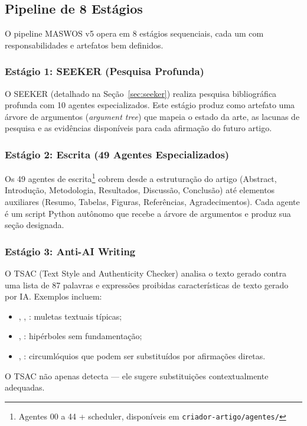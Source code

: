 \subsection{Pipeline de 8 Estágios}

O pipeline MASWOS v5 opera em 8 estágios sequenciais, cada um com
responsabilidades e artefatos bem definidos.

\subsubsection{Estágio 1: SEEKER (Pesquisa Profunda)}

O SEEKER (detalhado na Seção~\ref{sec:seeker}) realiza pesquisa
bibliográfica profunda com 10 agentes especializados. Este estágio
produz como artefato uma árvore de argumentos (\textit{argument
tree}) que mapeia o estado da arte, as lacunas de pesquisa e as
evidências disponíveis para cada afirmação do futuro artigo.

\subsubsection{Estágio 2: Escrita (49 Agentes Especializados)}

Os 49 agentes de escrita\footnote{Agentes 00 a 44 + scheduler,
disponíveis em \texttt{criador-artigo/agentes/}} cobrem desde a
estruturação do artigo (Abstract, Introdução, Metodologia,
Resultados, Discussão, Conclusão) até elementos auxiliares
(Resumo, Tabelas, Figuras, Referências, Agradecimentos). Cada
agente é um script Python autônomo que recebe a árvore de argumentos
e produz sua seção designada.

\subsubsection{Estágio 3: Anti-AI Writing}

O TSAC (Text Style and Authenticity Checker) analisa o texto gerado
contra uma lista de 87 palavras e expressões proibidas características
de texto gerado por IA\@. Exemplos incluem:
\begin{itemize}
\item {}, ,
: muletas textuais típicas;
\item {}, :
hipérboles sem fundamentação;
\item {}, : circumlóquios que podem ser substituídos por
afirmações diretas.
\end{itemize}
O TSAC não apenas detecta — ele sugere substituições contextualmente
adequadas.

